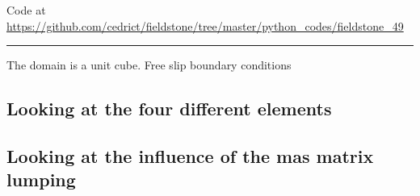 


\begin{center}
Code at \url{https://github.com/cedrict/fieldstone/tree/master/python_codes/fieldstone_49}
\end{center}

\par\noindent\rule{\textwidth}{0.4pt}

The domain is a unit cube. Free slip boundary conditions 

\subsection*{Looking at the four different elements}






\subsection*{Looking at the influence of the mas matrix lumping}

